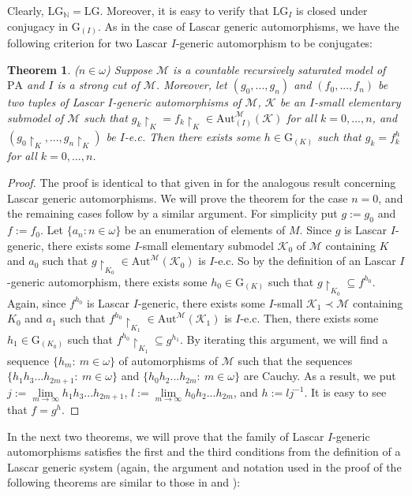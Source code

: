 \documentclass[11pt]{article}
\newtheorem{theorem}{Theorem}[section]
\theoremstyle{plain}
\theoremstyle{definition}
\newcommand{\M}{\mathcal{M}}
\newcommand{\K}{\mathcal{K}}
\newcommand{\NN}{\mathbb{N}}
\newcommand{\G}{\mathrm{G}}
\newcommand{\A}{\mathrm{Aut}}
\newcommand{\Aa}{\A_{(I)}^{\M}(\K)}
\newcommand{\pa}{\mathrm{PA}}
\newcommand{\LG}{\mathrm{LG}}
\begin{document}
Clearly, $\LG_{\NN}=\LG$. Moreover,
it is easy to verify that $\LG_{I}$  is closed under conjugacy in $\G_{(I)}$. As in the case of Lascar generic automorphisms, we have the following criterion for two Lascar $I$-generic automorphism to be conjugates:
\begin{theorem}
($n\in\omega$) 	Suppose $ \M $ is a countable  recursively saturated model of $ \pa $ and $I$ is a strong cut of $\M$.  Moreover, let  $(g_{0},...,g_{n})$ and $(f_{0},...,f_{n})$ be two tuples of Lascar $I$-generic automorphisms of $\M$,  $\K$ be an $I$-small elementary submodel of $\M$ such that ${g_{k}\upharpoonright_{K}=f_{k}\upharpoonright_{K}\in\Aa}$ for all $k=0,...,n$, and $(g_{0}\upharpoonright_{K},...,g_{n}\upharpoonright_{K})$ be $I$-e.c. Then there exists some $h\in\G_{(K)}$ such that $g_{k}=f_{k}^{h}$ for all $k=0,...,n$.
\end{theorem}
\begin{proof}
The proof is identical to that given in \cite{ksb} for the analogous result concerning Lascar generic automorphisms.	We will prove the theorem for the case $n=0$, and the remaining cases follow by a similar argument. For simplicity put $g:=g_{0}$ and $f:=f_{0}$. Let $ \{a_{n}: n\in\omega\} $ be an enumeration of elements of $ M $. Since $ g $ is Lascar $ I $-generic, there exists some $ I $-small elementary submodel  $ \K_{0} $ of $\M$ containing $ K $ and $ a_{0} $ such that $ g\upharpoonright_{K_{0}}\in \A^{\M}(\K_{0}) $ is $ I $-e.c. So by the definition of an Lascar $ I $-generic automorphism, there exists some $ h_{0}\in\G_{(K)} $ such that $ g\upharpoonright_{K_{0}}\subseteq f^{h_{0}} $. Again, since $ f^{h_{0}} $ is Lascar $ I $-generic, there exists some $ I $-small $ \K_{1}\prec\M $ containing $ K_{0} $ and $ a_{1} $ such that $ f^{h_{0}}\upharpoonright_{K_{1}}\in \A^{\M}(\K_{1}) $ is $ I $-e.c. Then, there exists some $ h_{1}\in\G_{(K_{0})} $ such that $ f^{h_{0}}\upharpoonright_{K_{1}}\subseteq g^{h_{1}} $. By iterating this argument, we will find a sequence  $ \{h_{m}: \ m\in\omega\} $ of automorphisms of $ \M $ such that the sequences $ \{h_{1}h_{3}...h_{2m+1}: \ m\in\omega\} $ and $ \{h_{0}h_{2}...h_{2m}: \ m\in\omega\} $ are Cauchy. As a result, we  put $ j:= \lim\limits_{m\rightarrow\infty} h_{1}h_{3}...h_{2m+1} $, $ l:= \lim\limits_{m\rightarrow\infty} h_{0}h_{2}...h_{2m}$, and $h:=lj^{-1}$. It is easy to see that $ f=g^{h} $.
\end{proof}
In the  next two theorems, we will prove that the family of Lascar $I$-generic automorphisms satisfies the first and the third conditions from the definition of a Lascar generic system (again, the argument and notation used in the proof of the following theorems are similar to those in \cite{las} and \cite{ksb}):
\end{document}
